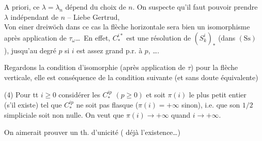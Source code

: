 A priori, ce $\lambda=\lambda_n$ dépend du choix de $n$. On suspecte qu'il faut pouvoir prendre $\lambda$ indépendant de $n$ --
Liebe Gertrud,\\
\quad Von einer dreiwöch
dans ce cas la flèche horizontale sera bien un isomorphisme  après application de $\tau_\omega$\ldots\ En effet,  $C_*^{i*}$ est une résolution de $(S_k^i)_*$ (dans $(\mathrm{Ss})$), jusqu'au degré $p$ si $i$ est assez grand p.r. à $p$, \ldots.

 Regardons la condition d'isomorphie (après application de $\tau$) pour la flèche verticale, elle  est conséquence de la condition suivante (et sans doute équivalente)

(4) Pour tt $i\geq0$ considérer les  $C_*^{ip}$ $(p\geq0)$ et soit $\pi(i)$ le plus petit entier (s'il existe) tel que $C_*^{ip}$ ne soit pas flasque ($\pi(i)=+\infty$ sinon),  i.e. que son \uline{} $1/2$ simpliciale  soit non nulle. On veut que $\pi(i)\longrightarrow+\infty$ quand $i\longrightarrow+\infty$.


On aimerait prouver un th. d'unicité ( déjà l'existence\ldots)

